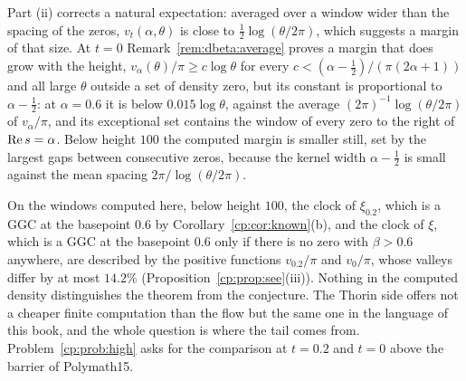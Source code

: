 Part (ii) corrects a natural expectation: averaged over a window wider than the spacing of the zeros, $v_t(\alpha,\theta)$ is close to $\frac12\log(\theta/2\pi)$, which suggests a margin of that size. At $t=0$ Remark~\ref{rem:dbeta:average} proves a margin that does grow with the height, $v_\alpha(\theta)/\pi\ge c\log\theta$ for every $c<(\alpha-\frac12)/(\pi(2\alpha+1))$ and all large $\theta$ outside a set of density zero, but its constant is proportional to $\alpha-\frac12$: at $\alpha=0.6$ it is below $0.015\log\theta$, against the average $(2\pi)^{-1}\log(\theta/2\pi)$ of $v_\alpha/\pi$, and its exceptional set contains the window of every zero to the right of $\operatorname{Re} s=\alpha$. Below height $100$ the computed margin is smaller still, set by the largest gaps between consecutive zeros, because the kernel width $\alpha-\frac12$ is small against the mean spacing $2\pi/\log(\theta/2\pi)$.

On the windows computed here, below height $100$, the clock of $\xi_{0.2}$, which is a GGC at the basepoint $0.6$ by Corollary~\ref{cp:cor:known}(b), and the clock of $\xi$, which is a GGC at the basepoint $0.6$ only if there is no zero with $\beta>0.6$ anywhere, are described by the positive functions $v_{0.2}/\pi$ and $v_0/\pi$, whose valleys differ by at most $14.2\%$ (Proposition~\ref{cp:prop:see}(iii)). Nothing in the computed density distinguishes the theorem from the conjecture. The Thorin side offers not a cheaper finite computation than the flow but the same one in the language of this book, and the whole question is where the tail comes from. Problem~\ref{cp:prob:high} asks for the comparison at $t=0.2$ and $t=0$ above the barrier of Polymath15.
